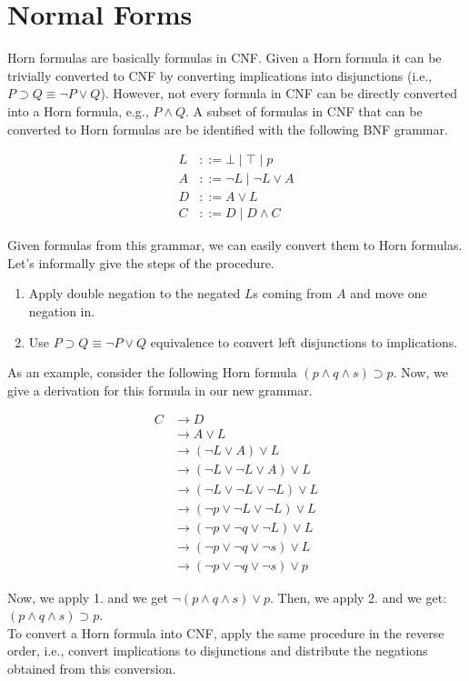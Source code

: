 \documentclass[11pt,a4paper]{article}
\begin{document}
\newpage
\section{Normal Forms}

Horn formulas are basically formulas in CNF. Given a Horn formula it can be trivially converted to CNF by converting implications into disjunctions (i.e., $P \supset Q \equiv \neg P \lor Q$). However, not every formula in CNF can be directly converted into a Horn formula, e.g., $P \land Q$. A subset of formulas in CNF that can be converted to Horn formulas are be identified with the following BNF grammar.

\begin{equation}
\begin{split}
	L & ::= \bot \mid \top \mid p \\
	A & ::= \neg L \mid \neg L \lor A \\
	D & ::= A \lor L \\
	C & ::= D \mid D \land C
\end{split}
\end{equation}

\noindent
Given formulas from this grammar, we can easily convert them to Horn formulas. Let's informally give the steps of the procedure.
\begin{enumerate}
	\item Apply double negation to the negated $L$s coming from $A$ and move one negation in.
	\item Use $P \supset Q \equiv \neg P \lor Q$ equivalence to convert left disjunctions to implications.
\end{enumerate}

\noindent
As an example, consider the following Horn formula $(p \land q \land s) \supset p$. Now, we give a derivation for this formula in our new grammar.

\begin{equation}
\begin{split}
	C & \rightarrow D \\
	    & \rightarrow A \lor L \\
	    & \rightarrow (\neg L \lor A) \lor L \\
	    & \rightarrow (\neg L \lor \neg L \lor A) \lor L \\
	    & \rightarrow (\neg L \lor \neg L \lor \neg L) \lor L \\
	    & \rightarrow (\neg p \lor \neg L \lor \neg L) \lor L \\
	    & \rightarrow (\neg p \lor \neg q \lor \neg L) \lor L \\
	    & \rightarrow (\neg p \lor \neg q \lor \neg s) \lor L \\
	    & \rightarrow (\neg p \lor \neg q \lor \neg s) \lor p
\end{split}
\end{equation}

\noindent
Now, we apply 1. and we get $\neg (p \land q \land s) \lor p$. Then, we apply 2. and we get: $(p \land q \land s) \supset p$.
\\
 \noindent
To convert a Horn formula into CNF, apply the same procedure in the reverse order, i.e., convert implications to disjunctions and distribute the negations obtained from this conversion.
\end{document}
